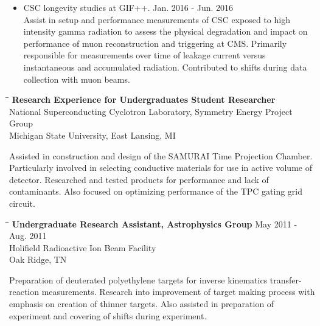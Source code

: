 \documentclass[10pt]{res} %
\begin{document}
\begin{resume}
\begin{itemize}
  \item CSC longevity studies at GIF++. \hfill{Jan. 2016 - Jun. 2016} \\
    Assist in setup and performance measurements
    of CSC exposed to high intensity gamma radiation to assess the physical degradation and impact on performance
    of muon reconstruction and triggering at CMS. Primarily responsible for measurements over time of leakage current
    versus instantaneous and accumulated radiation. Contributed to shifts during data collection with muon beams.
\end{itemize}

\begin{tabbing}
\hspace{2.3in}\= \hspace{2.5in}\= \kill %
  \textbf{Research Experience for Undergraduates Student Researcher} \> \\
National Superconducting Cyclotron Laboratory, Symmetry Energy Project Group \\
Michigan State University, East Lansing, MI \\
\end{tabbing}\vspace{-20pt}      %

Assisted in construction and design of the SAMURAI Time Projection Chamber. 
Particularly involved in selecting conductive materials for use in active 
volume of detector. Researched and tested products for performance and lack 
of contaminants. Also focused on optimizing performance of the TPC gating grid circuit.

\begin{tabbing}
\hspace{2.3in}\= \hspace{2.5in}\= \kill %
\textbf{Undergraduate Research Assistant, Astrophysics Group} \>\> May 2011 - Aug. 2011\\
Holifield Radioactive Ion Beam Facility \\
Oak Ridge, TN \\
\end{tabbing}\vspace{-20pt}      %

Preparation of deuterated polyethylene targets for inverse kinematics 
transfer-reaction measurements. Research into improvement of 
target making process with emphasis on creation of thinner targets. 
Also assisted in preparation of experiment and covering of shifts 
during experiment.


\end{resume}
\end{document}
